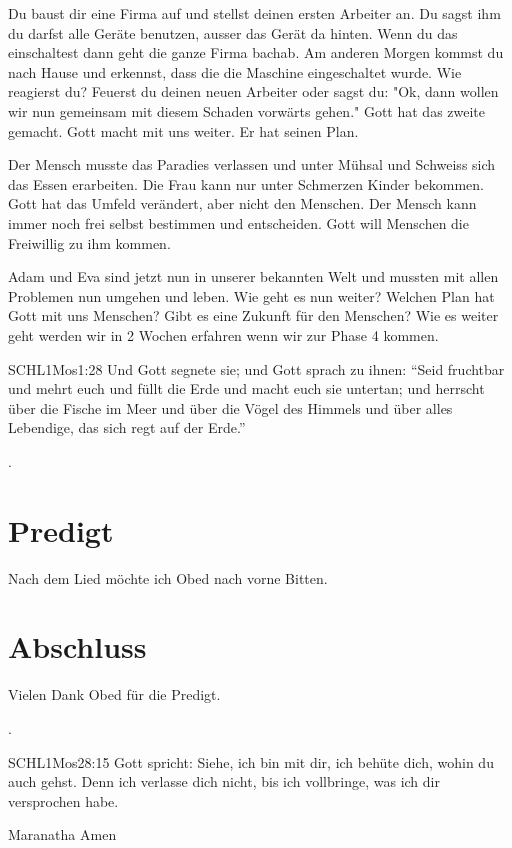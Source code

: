 \documentclass{../../inc/mybib}
\begin{document}
\begin{spacing}{1.5}
\begin{block}
        Du baust dir eine Firma auf und stellst deinen ersten Arbeiter an. Du sagst ihm du darfst alle Geräte benutzen, ausser das Gerät da hinten. Wenn du das einschaltest dann geht die ganze Firma bachab. Am anderen Morgen kommst du nach Hause und erkennst, dass die die Maschine eingeschaltet wurde. Wie reagierst du? Feuerst du deinen neuen Arbeiter oder sagst du: "Ok, dann wollen wir nun gemeinsam mit diesem Schaden vorwärts gehen." Gott hat das zweite gemacht. Gott macht mit uns weiter. Er hat seinen Plan.         
    \end{block} 
    \begin{block}
        Der Mensch musste das Paradies verlassen und unter Mühsal und Schweiss sich das Essen erarbeiten. Die Frau kann nur unter Schmerzen Kinder bekommen. Gott hat das Umfeld verändert, aber nicht den Menschen. Der Mensch kann immer noch frei selbst bestimmen und entscheiden. Gott will Menschen die Freiwillig zu ihm kommen.
    \end{block}
    \begin{block}
        Adam und Eva sind jetzt nun in unserer bekannten Welt und mussten mit allen Problemen nun umgehen und leben. Wie geht es nun weiter? Welchen Plan hat Gott mit uns Menschen? Gibt es eine Zukunft für den Menschen? Wie es weiter geht werden wir in 2 Wochen erfahren wenn wir zur Phase 4 kommen.
    \end{block}
    \begin{bibelbox}{SCHL}{1Mos}{1:28}
        Und Gott segnete sie; und Gott sprach zu ihnen: \enquote{Seid fruchtbar und mehrt euch und füllt die Erde und macht euch sie untertan; und herrscht über die Fische im Meer und über die Vögel des Himmels und über alles Lebendige, das sich regt auf der Erde.}
    \end{bibelbox}  
\end{spacing}
.

\section{Predigt}
Nach dem Lied möchte ich Obed nach vorne Bitten.

\section{Abschluss}
Vielen Dank Obed für die Predigt.

.

\beten{}

\begin{bibelbox}{SCHL}{1Mos}{28:15}
    Gott spricht: Siehe, ich bin mit dir,
    ich behüte dich, wohin du auch gehst.
    Denn ich verlasse dich nicht,
    bis ich vollbringe, was ich dir versprochen habe.
\end{bibelbox}

Maranatha Amen
\end{document}
